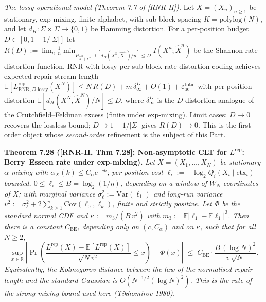 \documentclass[
]{article}
\begin{document}
\emph{The lossy operational model (Theorem 7.7 of [RNR-II]).} Let
$X=(X_n)_{n\ge1}$ be stationary, exp-mixing, finite-alphabet, with sub-block
spacing $K=\mathrm{polylog}(N)$, and let $d_H:\Sigma\times\Sigma\to\{0,1\}$ be
Hamming distortion. For a per-position budget $D\in[0,1-1/|\Sigma|]$ let
$R(D):=\lim_n\tfrac1n\min_{P_{\hat X^n\mid X^n}:\,\mathbb E[d_H(X^n,\hat X^n)/n]\le D}
I(X^n;\hat X^n)$ be the Shannon rate-distortion function. RNR with lossy
per-sub-block rate-distortion coding achieves expected repair-stream length
$\mathbb E[L^{\mathrm{rep}}_{\mathrm{RNR},D\text{-lossy}}(X^N)]\le
N\,R(D)+m\,\delta_\infty^D+O(1)+\varepsilon_{\mathrm{ac}}^{\mathrm{total}}$
with per-position distortion $\mathbb E[d_H(X^N,\hat X^N)/N]\le D$, where
$\delta_\infty^D$ is the $D$-distortion analogue of the Crutchfield--Feldman
excess (finite under exp-mixing). Limit cases: $D\to0$ recovers the lossless
bound; $D\to1-1/|\Sigma|$ gives $R(D)\to0$. This is the first-order object
whose \emph{second-order} refinement is the subject of this Part.

\textbf{Theorem 7.28 ([RNR-II, Thm 7.28]; Non-asymptotic CLT for
$L^{\mathrm{rep}}$: Berry--Esseen rate under exp-mixing).} \emph{Let
$X=(X_1,\ldots,X_N)$ be stationary $\alpha$-mixing with
$\alpha_X(k)\leq C_\alpha e^{-c k}$; per-position cost
$\ell_i:=-\log_2 Q_i(X_i\mid\mathrm{ctx}_i)$ bounded,
$0\leq\ell_i\leq B=\log_2(1/\eta)$, depending on a window of $W_N$ coordinates
of $X$; with marginal variance $\sigma_\ell^2:=\mathrm{Var}(\ell_1)$ and
long-run variance $v^2:=\sigma_\ell^2+2\sum_{k\geq1}\mathrm{Cov}(\ell_0,\ell_k)$,
finite and strictly positive. Let $\Phi$ be the standard normal CDF and
$\kappa:=m_3/(B\,v^2)$ with $m_3:=\mathbb E|\ell_1-\mathbb E\ell_1|^3$. Then
there is a constant $C_{\mathrm{BE}}$, depending only on $(c,C_\alpha)$ and on
$\kappa$, such that for all $N\geq2$,}
\[
  \sup_{x\in\mathbb R}
  \left|
    \Pr\!\left(
      \frac{L^{\mathrm{rep}}(X)-\mathbb E[L^{\mathrm{rep}}(X)]}{\sqrt{N\,v^2}}
      \leq x
    \right)-\Phi(x)
  \right|
  \;\leq\;
  C_{\mathrm{BE}}\cdot\frac{B\,(\log N)^2}{v\,\sqrt N}.
\]
\emph{Equivalently, the Kolmogorov distance between the law of the normalised
repair length and the standard Gaussian is $O(N^{-1/2}(\log N)^2)$. This is the rate of the
strong-mixing bound used here (Tikhomirov 1980).}
\end{document}
